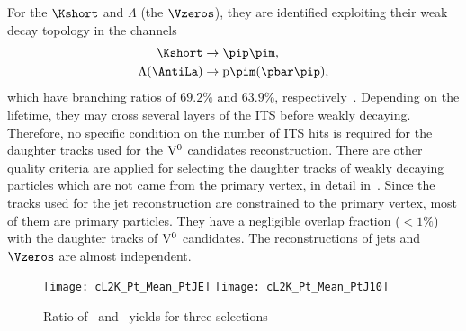 For the $\Kshort$ and $\Lambda$ (the $\Vzeros$),
they are identified exploiting their weak decay topology in the channels
\begin{equation}
\begin{split}
\Kshort & \to  \pip\pim, \\
\Lambda (\AntiLa) & \to {\rm p}\pim (\pbar\pip),
\end{split}
\end{equation}
which have branching ratios of $69.2\%$ and $63.9\%$,
respectively~\cite{Beringer:1900zz}.
Depending on the lifetime,
they may cross several layers of the ITS before weakly decaying.
Therefore, no specific condition on the number of ITS hits is required for
the daughter tracks used for the ${\rm V}^{0}$ candidates reconstruction.
There are other quality criteria are applied for selecting the daughter tracks of
weakly decaying particles which are not came from the primary vertex,
in detail in~\cite{Aamodt:2011zza}.
Since the tracks used for the jet reconstruction are constrained to the
primary vertex,  most of them are primary particles.
They have a negligible overlap fraction
($<1\%$)
with the daughter tracks of ${\rm V}^{0}$ candidates.
The reconstructions of jets and $\Vzeros$ are almost independent.



\begin{figure}[htbp]
   \centering
   \texttt{[image: cL2K\_Pt\_Mean\_PtJE]}
   \texttt{[image: cL2K\_Pt\_Mean\_PtJ10]}  
   \caption{Ratio of \lda\ and \ks\ yields for three selections  }
   \label{fig:L2Kratio}
\end{figure}

